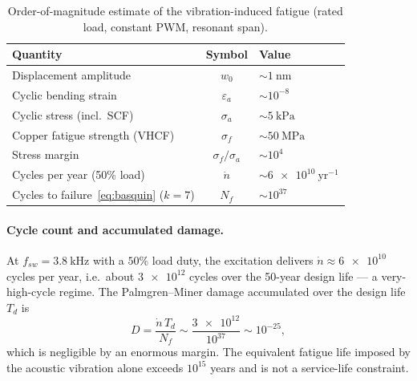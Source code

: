 \documentclass[11pt,a4paper,oneside]{book}
\begin{document}
\begin{onehalfspace}
\begin{appendices}
\begin{table}[h]
	\centering
	\caption{Order-of-magnitude estimate of the vibration-induced fatigue (rated load,
		constant PWM, resonant span).}
	\label{tab:fatigue}
	\begin{tabular}{@{}lcl@{}}
		\toprule
		Quantity & Symbol & Value \\
		\midrule
		Displacement amplitude & $w_0$ & $\sim\SI{1}{\nano\meter}$ \\
		Cyclic bending strain & $\varepsilon_a$ & $\sim 10^{-8}$ \\
		Cyclic stress (incl.\ SCF) & $\sigma_a$ & $\sim\SI{5}{\kilo\pascal}$ \\
		Copper fatigue strength (VHCF) & $\sigma_f$ & $\sim\SI{50}{\mega\pascal}$ \\
		Stress margin & $\sigma_f/\sigma_a$ & $\sim 10^{4}$ \\
		Cycles per year (50\% load) & $\dot n$ & $\sim\num{6e10}\ \mathrm{yr^{-1}}$ \\
		Cycles to failure~\eqref{eq:basquin} ($k=7$) & $N_f$ & $\sim 10^{37}$ \\
		\bottomrule
	\end{tabular}
\end{table}

\paragraph{Cycle count and accumulated damage.}
At $f_{sw}=\SI{3.8}{\kilo\hertz}$ with a $50\%$ load duty, the excitation delivers
$\dot n\approx\num{6e10}$ cycles per year, i.e.\ about $\num{3e12}$ cycles over the
\num{50}-year design life --- a very-high-cycle regime. The Palmgren--Miner damage
accumulated over the design life $T_d$ is
\begin{equation}
	D = \frac{\dot n\,T_d}{N_f} \sim \frac{\num{3e12}}{10^{37}} \sim 10^{-25},
	\label{eq:miner}
\end{equation}
which is negligible by an enormous margin. The equivalent fatigue life imposed by
the acoustic vibration alone exceeds $10^{15}$ years and is not a service-life
constraint.


\end{appendices}
\end{onehalfspace}
\end{document}
